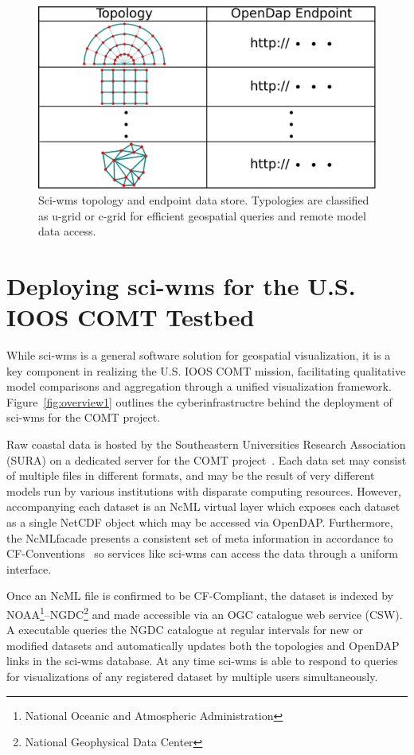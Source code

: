 \documentclass[11pt,twocolumn,twoside]{IEEEtran}
\newcommand{\comt}{COMT}
\newcommand{\ioos}{IOOS}
\newcommand{\sura}{SURA}
\newcommand{\ogc}{OGC}
\newcommand{\csw}{CSW}
\newcommand{\ugrid}{u-grid}
\newcommand{\cgrid}{c-grid}
\newcommand{\ncml}{NcML}
\newcommand{\noaa}{NOAA}
\newcommand{\ngdc}{NGDC}
\newcommand{\opendap}{OpenDAP}
\newcommand{\netcdf}{NetCDF}
\newcommand{\sciwms}{sci-wms}
\newcommand{\Sciwms}{Sci-wms}
\begin{document}
\begin{figure}
  \centering
  \includegraphics[width=\columnwidth]{./figs/sciwms_db_topology_endpoints.pdf}
  \caption{\Sciwms{} topology and endpoint data store. Typologies are
    classified as \ugrid{} or \cgrid{} for efficient geospatial
    queries and remote model data access.}
  \label{fig:sciwms_topology_endpoints}
\end{figure}

\section{Deploying \sciwms{} for the U.S. \ioos{} \comt{} Testbed}
While \sciwms{} is a general software solution for geospatial
visualization, it is a key component in realizing the U.S. \ioos{}
\comt{} mission, facilitating qualitative model comparisons and
aggregation through a unified visualization
framework. Figure~\ref{fig:overview1} outlines the cyberinfrastructre
behind the deployment of \sciwms{} for the \comt{} project.

Raw coastal data is hosted by the Southeastern Universities Research
Association (\sura{}) on a dedicated server for the \comt{}
project~\cite{luettich12}. Each data set may consist of multiple files
in different formats, and may be the result of very different models
run by various institutions with disparate computing
resources. However, accompanying each dataset is an \ncml{} virtual
layer which exposes each dataset as a single \netcdf{} object which
may be accessed via \opendap{}. Furthermore, the \ncml facade presents
a consistent set of meta information in accordance to
CF-Conventions~\cite{cf} so services like \sciwms{} can access
the data through a uniform interface.

Once an \ncml{} file is confirmed to be CF-Compliant, the dataset is
indexed by \noaa{}\footnote{National Oceanic and Atmospheric
  Administration}--\ngdc{}\footnote{National Geophysical Data Center}
and made accessible via an \ogc{} catalogue web service (\csw{}). A executable
queries the \ngdc{} catalogue at regular intervals for new or modified
datasets and automatically updates both the topologies and \opendap{}
links in the \sciwms{} database. At any time \sciwms{} is able to
respond to queries for visualizations of any registered dataset by
multiple users simultaneously.
\end{document}
